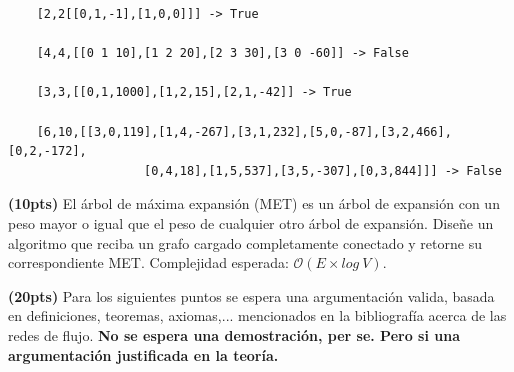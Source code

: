 \documentclass[12pt, a4paper]{exam}
\begin{document}
\begin{questions}
    \begin{verbatim}
    [2,2[[0,1,-1],[1,0,0]]] -> True
    
    [4,4,[[0 1 10],[1 2 20],[2 3 30],[3 0 -60]] -> False

    [3,3,[[0,1,1000],[1,2,15],[2,1,-42]] -> True
    
    [6,10,[[3,0,119],[1,4,-267],[3,1,232],[5,0,-87],[3,2,466],[0,2,-172],
                   [0,4,18],[1,5,537],[3,5,-307],[0,3,844]]] -> False
    \end{verbatim}
    
	\question  \textbf{(10pts)} El árbol de máxima expansión (MET) es un árbol de expansión con un peso mayor o igual que el peso de cualquier otro árbol de expansión. Diseñe un algoritmo que reciba un grafo cargado completamente conectado y retorne su correspondiente MET. Complejidad esperada: \textbf{$\mathcal{O}(E \times log \ V)$}.


 
	\question  \textbf{(20pts)}  Para los siguientes puntos se espera una argumentación valida, basada en definiciones, teoremas, axiomas,... mencionados en la bibliografía acerca de las redes de flujo. \textbf{No se espera una demostración, per se. Pero si una argumentación justificada en la teoría.}
	

\end{questions}
\end{document}
